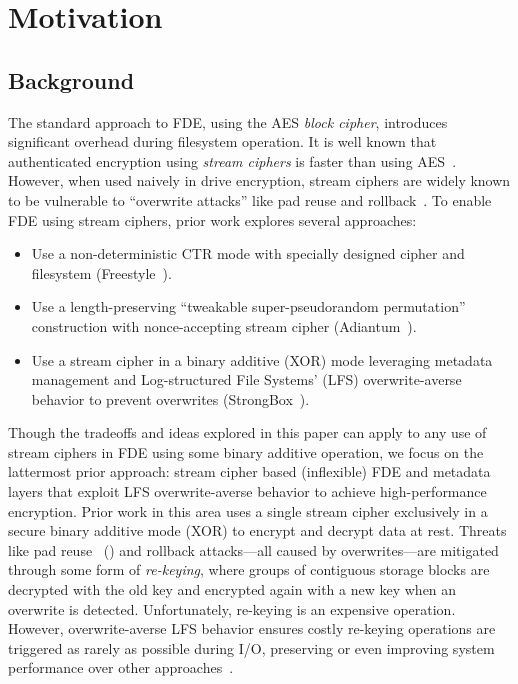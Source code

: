 \section{Motivation}\label{sec:motivation}

\subsection{Background}

The standard approach to FDE, using the AES \emph{block cipher}, introduces
significant overhead during filesystem operation. It is well known that
authenticated encryption using \emph{stream ciphers} is faster than using
AES~\cite{StrongBox, AnotherPaper1, AnotherPaper2}. However, when used naively
in drive encryption, stream ciphers are widely known to be vulnerable to
``overwrite attacks'' like pad reuse and rollback~\cite{KatzLindell, StrongBox}.
To enable FDE using stream ciphers, prior work explores several approaches:

\begin{itemize}
   \item Use a non-deterministic CTR mode with specially designed cipher and
   filesystem (Freestyle~\cite{Freestyle}).
   \item Use a length-preserving ``tweakable super-pseudorandom permutation''
   construction with nonce-accepting stream cipher (Adiantum~\cite{Adiantum}).
   \item Use a stream cipher in a binary additive (XOR) mode leveraging metadata
   management and Log-structured File Systems' (LFS) overwrite-averse behavior
   to prevent overwrites (StrongBox~\cite{StrongBox}).
\end{itemize}

Though the tradeoffs and ideas explored in this paper can apply to any use of
stream ciphers in FDE using some binary additive operation, we focus on the
lattermost prior approach: stream cipher based (inflexible) FDE and metadata
layers that exploit LFS overwrite-averse behavior to achieve high-performance
encryption. Prior work in this area uses a single stream cipher exclusively in a
secure binary additive mode (XOR) to encrypt and decrypt data at rest. Threats
like pad reuse~\cite{KatzLindell} () and rollback attacks---all
caused by overwrites---are mitigated through some form of \emph{re-keying},
where groups of contiguous storage blocks are decrypted with the old key and
encrypted again with a new key when an overwrite is detected. Unfortunately,
re-keying is an expensive operation. However, overwrite-averse LFS behavior
ensures costly re-keying operations are triggered as rarely as possible during
I/O, preserving or even improving system performance over other
approaches~\cite{StrongBox}.

